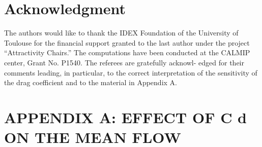 \section*{Acknowledgment}
The authors would like to thank the IDEX Foundation of the University of Toulouse for the
financial support granted to the last author under the project “Attractivity Chairs.” The computations
have been conducted at the CALMIP center, Grant No. P1540. The referees are gratefully acknowl-
edged for their comments leading, in particular, to the correct interpretation of the sensitivity of the
drag coefficient and to the material in Appendix A.



\section*{APPENDIX A: EFFECT OF C d ON THE MEAN FLOW}

